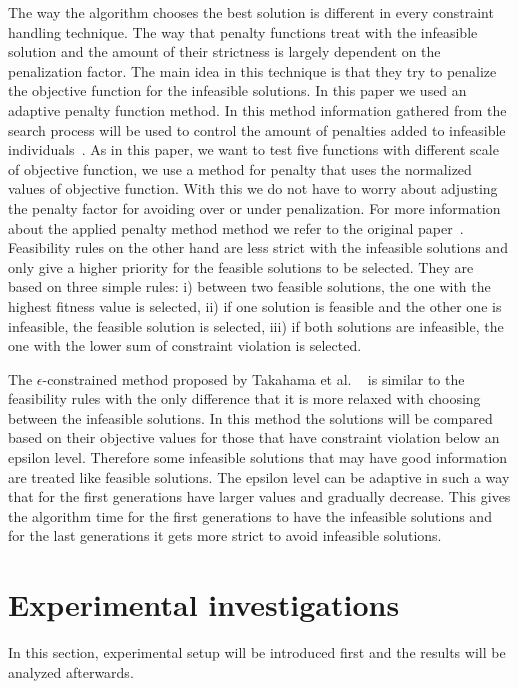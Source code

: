 \documentclass[review]{elsarticle}
\begin{document}
The way the algorithm chooses the best solution is different in every constraint handling technique. 
The way that penalty functions treat with the infeasible solution and the amount of their strictness is largely dependent on the penalization factor. The main idea in this technique is that they try to penalize the objective function for the infeasible solutions. In this paper we used an adaptive penalty function method. In this method information gathered from the search process will be used to control the amount of penalties added to infeasible individuals~\citep{tessema2009adaptive}. As in this paper, we want to test five functions with different scale of objective function, we use a method for penalty that uses the normalized values of objective function. With this we do not have to worry about adjusting the penalty factor for avoiding over or under penalization. For more information about the applied penalty method method we refer to the original paper~\citep{tessema2009adaptive}.
Feasibility rules on the other hand are less strict with the infeasible solutions and only give a higher priority for the feasible solutions to be selected. They are based on three simple rules: i) between two feasible solutions, the one with the highest fitness 
value is selected, ii) if one solution is feasible and the other one is infeasible, the 
feasible solution is selected, iii) if both solutions are infeasible, the one with the lower sum of constraint violation is selected.

The $\epsilon$-constrained method proposed by Takahama et al. ~\citep{takahama2005constrained} is similar to the feasibility rules with the only difference that it is more relaxed with choosing between the infeasible solutions. In this method the solutions will be compared based on their objective values for those that have constraint violation below an epsilon level. Therefore some infeasible solutions that may have good information are treated like feasible solutions. The epsilon level can be adaptive in such a way that for the first generations have larger values and gradually decrease.
This gives the algorithm time for the first generations to have the infeasible solutions and for the last generations it gets more strict to avoid infeasible solutions. 


\section{Experimental investigations}
In this section, experimental setup will be introduced first and the results will be analyzed afterwards.
\label{sec:Experiment}
\end{document}
